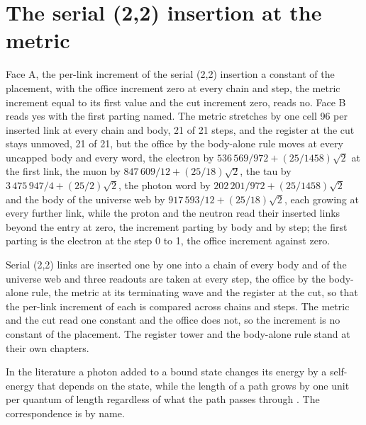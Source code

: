 \section{The serial (2,2) insertion at the metric}\label{mod:X-6-D540763-w-sttw}
\begin{chwall}\label{box:X-6-D540763-w-sttw:1}
Face A, the per-link increment of the serial (2,2) insertion a constant of the placement, with the office increment zero at every chain and step, the metric increment equal to its first value and the cut increment zero, reads no. Face B reads yes with the first parting named. The metric stretches by one cell 96 per inserted link at every chain and body, 21 of 21 steps, and the register at the cut stays unmoved, 21 of 21, but the office by the body-alone rule moves at every uncapped body and every word, the electron by $536\,569/972 + (25/1458)\sqrt{2}$ at the first link, the muon by $847\,609/12 + (25/18)\sqrt{2}$, the tau by $3\,475\,947/4 + (25/2)\sqrt{2}$, the photon word by $202\,201/972 + (25/1458)\sqrt{2}$ and the body of the universe web by $917\,593/12 + (25/18)\sqrt{2}$, each growing at every further link, while the proton and the neutron read their inserted links beyond the entry at zero, the increment parting by body and by step; the first parting is the electron at the step 0 to 1, the office increment against zero.
\end{chwall}
Serial (2,2) links are inserted one by one into a chain of every body and of the universe web and three readouts are taken at every step, the office by the body-alone rule, the metric at its terminating wave and the register at the cut, so that the per-link increment of each is compared across chains and steps. The metric and the cut read one constant and the office does not, so the increment is no constant of the placement. The register tower and the body-alone rule stand at their own chapters.
\begin{chbridge}
In the literature a photon added to a bound state changes its energy by a self-energy that depends on the state, while the length of a path grows by one unit per quantum of length regardless of what the path passes through \cite{Weinberg1995,Wald1984}. The correspondence is by name.
\end{chbridge}
